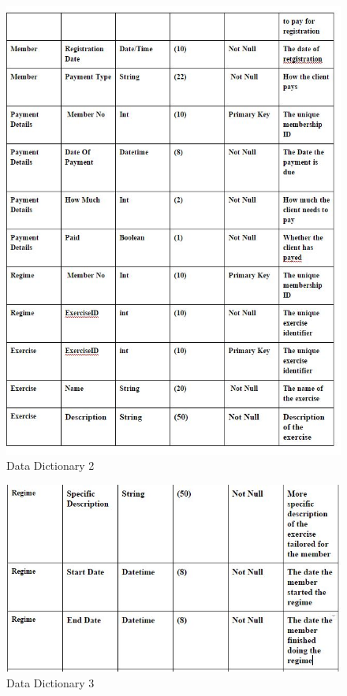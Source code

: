 \begin{figure}[H]
    \includegraphics[width=\textwidth]{DataDictionaryProposed2.JPG}
    \caption{Data Dictionary 2} \label{fig: Data Destinations and Sources 2 }
\end{figure}

\begin{figure}[H]
    \includegraphics[width=\textwidth]{New_dictionary3.JPG}
    \caption{Data Dictionary 3} \label{fig: Data Destinations and Sources 2 }
\end{figure}

